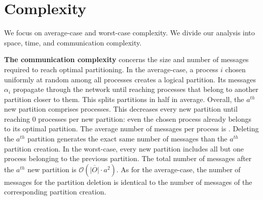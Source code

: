 



\section{Complexity}
\label{sec:complexity}


We focus on average-case and worst-case complexity. We divide our
analysis into space, time, and communication complexity.

\textbf{The communication complexity} concerns the size and number of
messages required to reach optimal partitioning. In the average-case,
a process $i$ chosen uniformly at random among all processes creates a
logical partition. Its messages $\alpha_i$ propagate through the
network until reaching processes that belong to another partition
closer to them. This splits partitions in half in average. Overall,
the $a^{th}$ new partition comprises
processes. This decreases every new partition until reaching $0$
processes per new partition: even the chosen process already belongs
to its optimal partition. The average number of messages per process
is .  Deleting the
$a^{th}$ partition generates the exact same number of messages than
the $a^{th}$ partition creation.  In the
worst-case, every new partition includes all but one process belonging
to the previous partition. The total number of messages after the
$a^{th}$ new partition is $\mathcal{O}(\overline{|O|}\cdot a^2)$. As
for the average-case, the number of messages for the partition
deletion is identical to the number of messages of the corresponding
partition creation.

